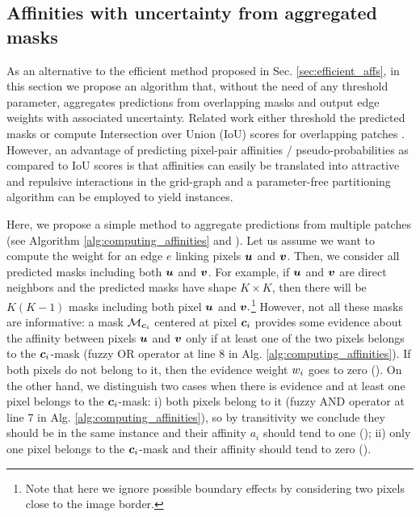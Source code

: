 \subsection{Affinities with uncertainty from aggregated masks}\label{sec:aggr_affs}
As an alternative to the efficient method proposed in Sec. \ref{sec:efficient_affs}, in this section we propose an algorithm that, without the need of any threshold parameter, aggregates predictions from overlapping \maskname masks and output edge weights with associated uncertainty.
Related work either threshold the predicted \maskname masks \cite{januszewski2018high,hirsch2020patchperpix,meirovitch2016multi} or compute Intersection over Union (IoU) scores for overlapping patches \cite{liu2016multi}. However, an advantage of predicting pixel-pair affinities / pseudo-probabilities as compared to IoU scores is that affinities can easily be translated into attractive and repulsive interactions in the grid-graph 
and a parameter-free partitioning algorithm can be employed to yield instances.

Here, we propose a simple method to aggregate predictions from multiple patches (see Algorithm \ref{alg:computing_affinities} and ). Let us assume we want to compute the weight for an edge $e$ linking pixels $\bm{u}$ and $\bm{v}$. Then, we consider all predicted \maskname masks including both $\bm{u}$ and $\bm{v}$. For example, if $\bm{u}$ and $\bm{v}$ are direct neighbors and the predicted masks have shape $K\times K$, then there will be $K(K-1)$ masks including both pixel $\bm{u}$ and $\bm{v}.$\footnote{Note that here we ignore possible boundary effects by considering two pixels close to the image border.} 
However, not all these masks are informative: a mask $\mathcal{M}_{\bm{c}_i}$ centered at pixel $\bm{c}_i$ provides some evidence about the affinity between pixels $\bm{u}$ and $\bm{v}$ only if at least one of the two pixels belongs to the $\bm{c}_i$-mask (fuzzy OR operator at line 8 in Alg. \ref{alg:computing_affinities}).
If both pixels do not belong to it, then the evidence weight $w_i$ goes to zero ().
On the other hand, we distinguish two cases when there is evidence and at least one pixel belongs to the $\bm{c}_i$-mask: i)
both pixels belong to it (fuzzy AND operator at line 7 in Alg. \ref{alg:computing_affinities}), so by transitivity we conclude they should be in the same instance and their affinity $a_i$ should tend to one (); 
ii) only one pixel belongs to the $\bm{c}_i$-mask and their affinity should tend to zero (). 

